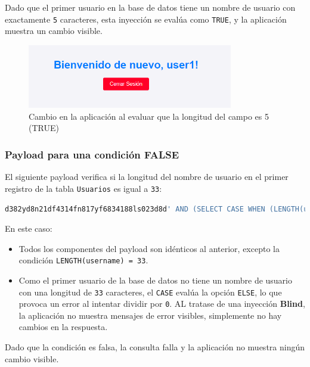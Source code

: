\documentclass[a4paper,12pt]{article}
\begin{document}
Dado que el primer usuario en la base de datos tiene un nombre de usuario con exactamente \texttt{5} caracteres, esta inyección se evalúa como \texttt{TRUE}, y la aplicación muestra un cambio visible.

\begin{figure}[H]
    \centering
    \includegraphics[width=0.8\textwidth]{Imagenes/blind4.png}
    \caption{Cambio en la aplicación al evaluar que la longitud del campo es 5 (TRUE)}
\end{figure}

\subsubsection{Payload para una condición FALSE}

El siguiente payload verifica si la longitud del nombre de usuario en el primer registro de la tabla \texttt{Usuarios} es igual a \texttt{33}:

\begin{lstlisting}[language=SQL]
d382yd8n21df4314fn817yf6834188ls023d8d' AND (SELECT CASE WHEN (LENGTH(username) = 33) THEN 1 ELSE 1/0 END FROM (SELECT username, ROWNUM AS rn FROM Usuarios) WHERE rn=1) = 1 --
\end{lstlisting}

En este caso:
\begin{itemize}
    \item Todos los componentes del payload son idénticos al anterior, excepto la condición \texttt{LENGTH(username) = 33}.
    \item Como el primer usuario de la base de datos no tiene un nombre de usuario con una longitud de \texttt{33} caracteres, el \texttt{CASE} evalúa la opción \texttt{ELSE}, lo que provoca un error al intentar dividir por \texttt{0}. AL tratase de una inyección \textbf{Blind}, la aplicación no muestra mensajes de error visibles, simplemente no hay cambios en la respuesta.
\end{itemize}

Dado que la condición es falsa, la consulta falla y la aplicación no muestra ningún cambio visible.
\end{document}
